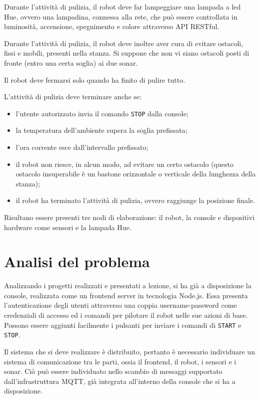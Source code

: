 Durante l'attività di pulizia, il robot deve far lampeggiare una lampada a led Hue, ovvero una lampadina, connessa alla rete, che può essere controllata in luminosità, accensione, spegnimento e colore attraverso API RESTful.

Durante l'attività di pulizia, il robot deve inoltre aver cura di evitare ostacoli, fissi e mobili, presenti nella stanza. Si suppone che non vi siano ostacoli posti di fronte (entro una certa soglia) ai due sonar.

Il robot deve fermarsi solo quando ha finito di pulire tutto.

L'attività di pulizia deve terminare anche se:
\begin{itemize}
\item l'utente autorizzato invia il comando \texttt{STOP} dalla console;
\item la temperatura dell'ambiente supera la soglia prefissata;
\item l'ora corrente esce dall'intervallo prefissato;
\item il robot non riesce, in alcun modo, ad evitare un certo ostacolo (questo ostacolo insuperabile è un bastone orizzontale o verticale della lunghezza della stanza);
\item il robot ha terminato l'attività di pulizia, ovvero raggiunge la posizione finale.
\end{itemize}

Risultano essere presenti tre nodi di elaborazione: il robot, la console e dispositivi hardware come sensori e la lampada Hue.

\section{Analisi del problema}
Analizzando i progetti realizzati e presentati a lezione, si ha già a disposizione la console, realizzata come un frontend server in tecnologia Node.js. Essa presenta l'autenticazione degli utenti attraverso una coppia username-password come credenziali di accesso ed i comandi per pilotare il robot nelle sue azioni di base. Possono essere aggiunti facilmente i pulsanti per inviare i comandi di \texttt{START} e \texttt{STOP}.

Il sistema che si deve realizzare è distribuito, pertanto è necessario individuare un sistema di comunicazione tra le parti, ossia il frontend, il robot, i sensori e i sonar. Ciò può essere individuato nello scambio di messaggi supportato dall'infrastruttura MQTT, già integrata all'interno della console che si ha a disposizione. 

